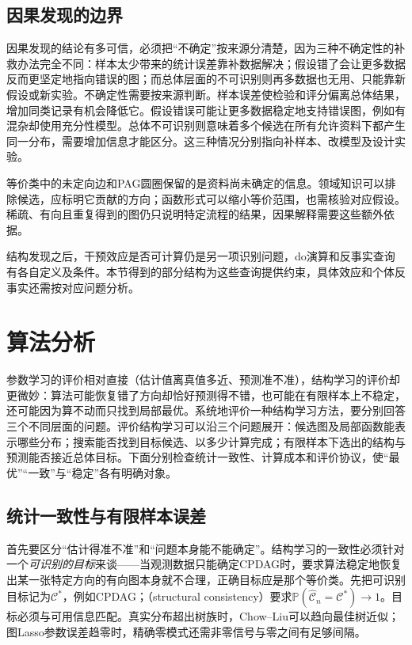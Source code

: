 \subsection{因果发现的边界}
\label{sec:pgm-structure-learning-causal-limits}

因果发现的结论有多可信，必须把“不确定”按来源分清楚，因为三种不确定性的补救办法完全不同：样本太少带来的统计误差靠补数据解决；假设错了会让更多数据反而更坚定地指向错误的图；而总体层面的不可识别则再多数据也无用、只能靠新假设或新实验。不确定性需要按来源判断。样本误差使检验和评分偏离总体结果，增加同类记录有机会降低它。假设错误可能让更多数据稳定地支持错误图，例如有混杂却使用充分性模型。总体不可识别则意味着多个候选在所有允许资料下都产生同一分布，需要增加信息才能区分。这三种情况分别指向补样本、改模型及设计实验。

等价类中的未定向边和PAG圆圈保留的是资料尚未确定的信息。领域知识可以排除候选，应标明它贡献的方向；函数形式可以缩小等价范围，也需核验对应假设。稀疏、有向且重复得到的图仍只说明特定流程的结果，因果解释需要这些额外依据。

结构发现之后，干预效应是否可计算仍是另一项识别问题，do演算和反事实查询有各自定义及条件。本节得到的部分结构为这些查询提供约束，具体效应和个体反事实还需按对应问题分析。

\section{算法分析}
\label{sec:pgm-structure-learning-analysis}

参数学习的评价相对直接（估计值离真值多近、预测准不准），结构学习的评价却更微妙：算法可能恢复错了方向却恰好预测得不错，也可能在有限样本上不稳定，还可能因为算不动而只找到局部最优。系统地评价一种结构学习方法，要分别回答三个不同层面的问题。评价结构学习可以沿三个问题展开：候选图及局部函数能表示哪些分布；搜索能否找到目标候选、以多少计算完成；有限样本下选出的结构与预测能否接近总体目标。下面分别检查统计一致性、计算成本和评价协议，使“最优”“一致”与“稳定”各有明确对象。

\subsection{统计一致性与有限样本误差}
\label{sec:pgm-structure-learning-consistency}

首先要区分“估计得准不准”和“问题本身能不能确定”。结构学习的一致性必须针对一个\emph{可识别的目标}来谈——当观测数据只能确定CPDAG时，要求算法稳定地恢复出某一张特定方向的有向图本身就不合理，正确目标应是那个等价类。先把可识别目标记为$\mathcal{C}^{*}$，例如CPDAG；（structural consistency）要求$\mathbb{P}(\widehat{\mathcal{C}}_n=\mathcal{C}^{*})\to1$。目标必须与可用信息匹配。真实分布超出树族时，Chow--Liu可以趋向最佳树近似；图Lasso参数误差趋零时，精确零模式还需非零信号与零之间有足够间隔。

